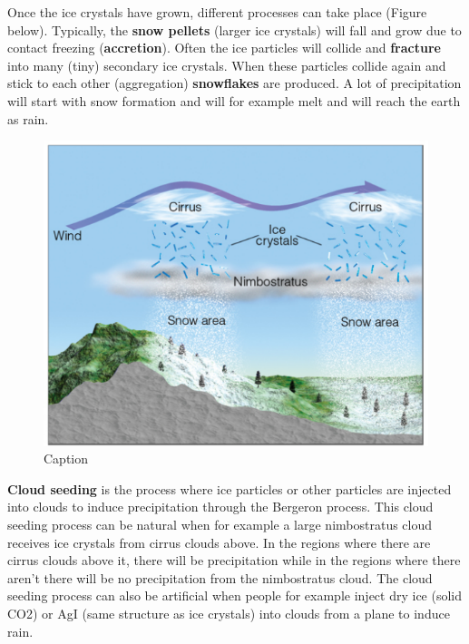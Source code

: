 \documentclass[12pt,oneside]{book}
\begin{document}
Once the ice crystals have grown, different processes can take place
(Figure below). Typically, the \textbf{snow pellets} (larger ice
crystals) will fall and grow due to contact freezing
(\textbf{accretion}). Often the ice particles will collide and
\textbf{fracture} into many (tiny) secondary ice crystals. When these
particles collide again and stick to each other (aggregation)
\textbf{snowflakes} are produced. A lot of precipitation will start with
snow formation and will for example melt and will reach the earth as
rain.

\begin{figure}

{\centering \includegraphics[width=0.9\linewidth]{figures/Figure333} 

}

\caption{Caption}\label{fig:Bergeron5}
\end{figure}

\textbf{Cloud seeding} is the process where ice particles or other
particles are injected into clouds to induce precipitation through the
Bergeron process. This cloud seeding process can be natural when for
example a large nimbostratus cloud receives ice crystals from cirrus
clouds above. In the regions where there are cirrus clouds above it,
there will be precipitation while in the regions where there aren't
there will be no precipitation from the nimbostratus cloud. The cloud
seeding process can also be artificial when people for example inject
dry ice (solid CO2) or AgI (same structure as ice crystals) into clouds
from a plane to induce rain.
\end{document}
